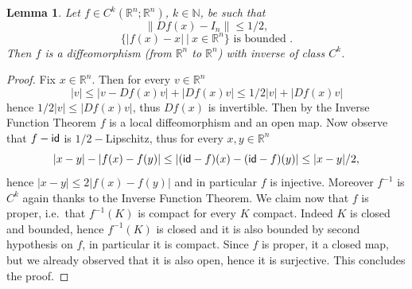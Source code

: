 \documentclass[11pt]{article}
\newcommand{\rr}{\mathbb{R}}
\theoremstyle{plain}
\newtheorem{lemma}[theorem]{Lemma}
\theoremstyle{definition}
\numberwithin{equation}{section}
\begin{document}
\begin{lemma}\label{diffeo}
	Let $f\in C^k(\rr^n;\rr^n)$, $k \in \mathbb{N}$, be such that \[\|Df(x)-I_n\|\le 1/2,\]
	\[\{|f(x)-x| \ | \ x \in \rr^n \} \text{ is bounded }.\]
	Then $f$ is a diffeomorphism (from $\rr^n$ to $\rr^n$) with inverse of class  $C^k$.
\end{lemma}
\begin{proof}
	Fix $x \in \rr^n$. Then for every $v \in \rr^n$
	\[|v|\le |v-Df(x)v|+|Df(x)v|\le 1/2 |v|+|Df(x)v|\]
	hence $1/2|v|\le |Df(x)v|$, thus $Df(x)$ is invertible. Then by the Inverse Function Theorem $f$ is a local diffeomorphism and an open map. Now observe that $f- {\sf{id}} $ is $1/2-$Lipschitz, thus for every $x,y \in \rr^n$
	\begin{equation} \label{eq:lip trick}
 |x-y|-|f(x)-f(y)|\le |({\sf{id}}-f)(x)-({\sf{id}}-f)(y)|\le |x-y|/2,
	\end{equation}
	hence $|x-y|\le 2|f(x)-f(y)| $ and in particular $f$ is injective. Moreover $f^{-1}$ is  $C^k$ again thanks to the Inverse Function Theorem. We claim now that $f$ is proper, i.e.\ that $f^{-1}(K)$ is compact for every $K$ compact. Indeed $K$ is closed and bounded, hence $f^{-1}(K)$ is closed and it is also bounded by second hypothesis on $f$, in particular  it is compact. Since $f$ is proper, it a closed map, but we already observed that it is also open, hence it is surjective. This concludes the proof.
\end{proof}
\end{document}
